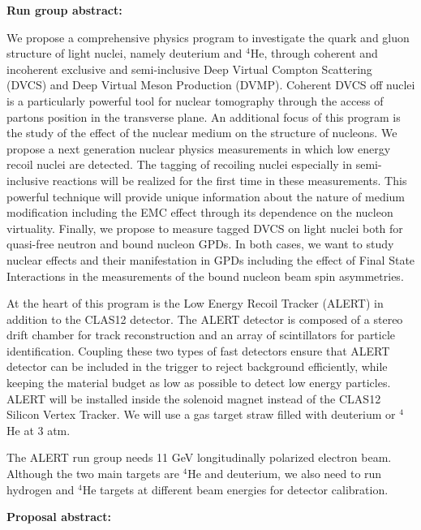 {\large\textbf{Run group abstract:}}
\newline

We propose a comprehensive physics program to investigate the quark and
gluon structure of light nuclei, namely deuterium and $^4$He, through coherent and
incoherent exclusive and semi-inclusive Deep Virtual Compton Scattering (DVCS) and
Deep Virtual Meson Production (DVMP). Coherent DVCS off nuclei is a particularly
powerful tool for nuclear tomography through the access of partons position in the
transverse plane. An additional focus of this program is the study of the effect of the
nuclear medium on the structure of nucleons. We propose a next generation nuclear
physics measurements in which low energy recoil nuclei are detected. The tagging of
recoiling nuclei especially in semi-inclusive reactions will be realized for the first time in
these measurements. This powerful technique will provide unique information about the
nature of medium modification including the EMC effect through its dependence on the
nucleon virtuality. Finally, we propose to measure tagged DVCS on light nuclei both for
quasi-free neutron and bound nucleon GPDs. In both cases, we want to study nuclear
effects and their manifestation in GPDs including the effect of Final State Interactions in
the measurements of the bound nucleon beam spin asymmetries.

At the heart of this program is the Low Energy Recoil Tracker (ALERT) in addition
to the CLAS12 detector. The ALERT detector is composed of a stereo drift chamber for
track reconstruction and an array of scintillators for particle identification. Coupling these
two types of fast detectors ensure that ALERT detector can be included in the trigger to
reject background efficiently, while keeping the material budget as low as possible to
detect low energy particles. ALERT will be installed inside the solenoid magnet instead
of the CLAS12 Silicon Vertex Tracker. We will use a gas target straw filled with
deuterium or $^4$He at 3 atm.

The ALERT run group needs 11 GeV longitudinally polarized electron beam.
Although the two main targets are $^4$He and deuterium, we also need to run hydrogen and
$^4$He targets at different beam energies for detector calibration.

\newpage
{\large\textbf{Proposal abstract:}}
\newline

